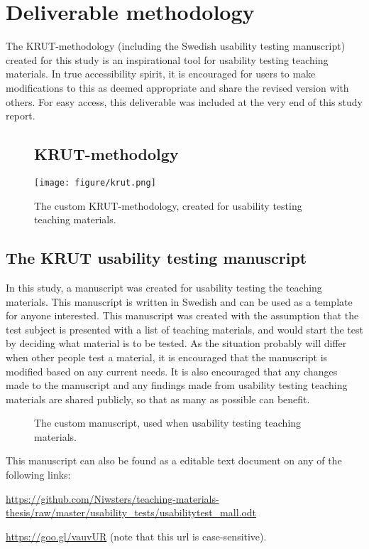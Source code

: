 \chapter{Deliverable methodology}
The KRUT-methodology (including the Swedish usability testing manuscript) created for this study is an inspirational tool for usability testing teaching materials. In true accessibility spirit, it is encouraged for users to make modifications to this as deemed appropriate and share the revised version with others. For easy access, this deliverable was included at the very end of this study report. 

\mbox{}
\begin{sidewaysfigure}
\section{KRUT-methodolgy}
\texttt{[image: figure/krut.png]}
\vspace*{2cm}
\caption{The custom KRUT-methodology, created for usability testing teaching materials.}
\label{app:krut}
\end{sidewaysfigure}

\newpage
\section{The KRUT usability testing manuscript} \label{krutscript}
In this study, a manuscript was created for usability testing the teaching materials. This manuscript is written in Swedish and can be used as a template for anyone interested. This manuscript was created with the assumption that the test subject is presented with a list of teaching materials, and would start the test by deciding what material is to be tested. As the situation probably will differ when other people test a material, it is encouraged that the manuscript is modified based on any current needs. It is also encouraged that any changes made to the manuscript and any findings made from usability testing teaching materials are shared publicly, so that as many as possible can benefit.

\begin{figure}[h]
\caption{The custom manuscript, used when usability testing teaching materials.}
\label{app:script}
\end{figure}

This manuscript can also be found as a editable text document on any of the following links:

\url{https://github.com/Niwsters/teaching-materials-thesis/raw/master/usability_tests/usabilitytest_mall.odt}

\url{https://goo.gl/vauvUR} (note that this url is case-sensitive).

